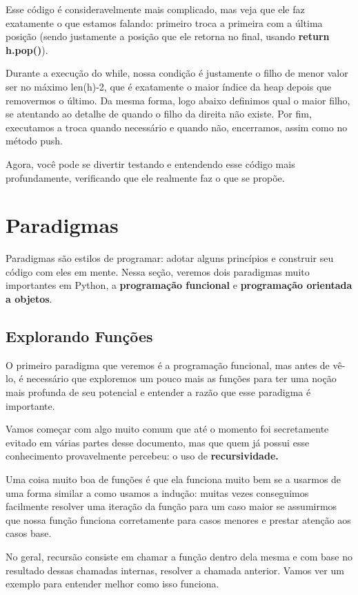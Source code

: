 \documentclass[11pt, a4paper]{article}
\begin{document}
Esse código é consideravelmente mais complicado, mas veja que ele faz exatamente o que estamos falando: primeiro troca a primeira com a última posição (sendo justamente a posição que ele retorna no final, usando \textbf{return h.pop()}).

Durante a execução do while, nossa condição é justamente o filho de menor valor ser no máximo len(h)-2, que é exatamente o maior índice da heap depois que removermos o último. Da mesma forma, logo abaixo definimos qual o maior filho, se atentando ao detalhe de quando o filho da direita não existe. Por fim, executamos a troca quando necessário e quando não, encerramos, assim como no método push.

Agora, você pode se divertir testando e entendendo esse código mais profundamente, verificando que ele realmente faz o que se propõe.
\newpage

\section{Paradigmas}

Paradigmas são estilos de programar: adotar alguns princípios e construir seu código com eles em mente. Nessa seção, veremos dois paradigmas muito importantes em Python, a \textbf{programação funcional} e \textbf{programação orientada a objetos}.

\subsection{Explorando Funções}

    O primeiro paradigma que veremos é a programação funcional, mas antes de vê-lo, é necessário que exploremos um pouco mais as funções para ter uma noção mais profunda de seu potencial e entender a razão que esse paradigma é importante.

    Vamos começar com algo muito comum que até o momento foi secretamente evitado em várias partes desse documento, mas que quem já possui esse conhecimento provavelmente percebeu: o uso de \textbf{recursividade.}

    Uma coisa muito boa de funções é que ela funciona muito bem se a usarmos de uma forma similar a como usamos a indução: muitas vezes conseguimos facilmente resolver uma iteração da função para um caso maior se assumirmos que nossa função funciona corretamente para casos menores e prestar atenção aos casos base.

    No geral, recursão consiste em chamar a função dentro dela mesma e com base no resultado dessas chamadas internas, resolver a chamada anterior. Vamos ver um exemplo para entender melhor como isso funciona.
\end{document}
